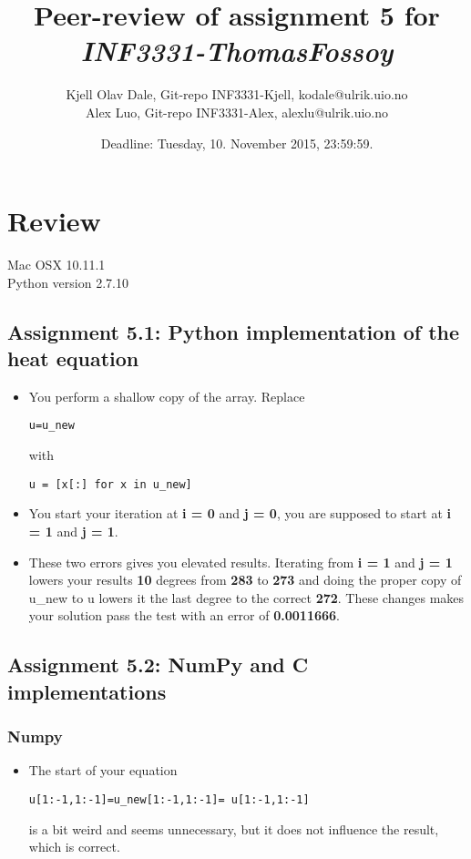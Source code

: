 \documentclass[a4paper]{article}
\title{Peer-review of assignment 5 for \textit{INF3331-ThomasFossoy}}
\author{Kjell Olav Dale, Git-repo INF3331-Kjell, {kodale@ulrik.uio.no} \\
 		Alex Luo, Git-repo INF3331-Alex, {alexlu@ulrik.uio.no}}
\date{Deadline: Tuesday, 10. November 2015, 23:59:59.}
\begin{document}
\maketitle

\section{Review}\label{sec:review}
Mac OSX 10.11.1\\Python version 2.7.10


\subsection*{Assignment 5.1:  Python implementation of the heat equation}
\begin{itemize}
\item You perform a shallow copy of the array. Replace\\\begin{verbatim}
u=u_new
\end{verbatim}
with\\\begin{verbatim}
u = [x[:] for x in u_new]
\end{verbatim}
\item You start your iteration at \textbf{i = 0} and \textbf{j = 0}, you are supposed to start at \textbf{i = 1} and \textbf{j = 1}.
\item These two errors gives you elevated results. Iterating from \textbf{i = 1} and \textbf{j = 1} lowers your results \textbf{10} degrees from \textbf{283} to \textbf{273} and doing the proper copy of u\_new to u lowers it the last degree to the correct \textbf{272}. These changes makes your solution pass the test with an error of \textbf{0.0011666}.

\end{itemize}

\subsection*{Assignment 5.2: NumPy and C implementations} \label{sec:assignment5.2}
\subsubsection*{Numpy} \label{sec:Numpy}
\begin{itemize}
\item The start of your equation\\\begin{verbatim}
u[1:-1,1:-1]=u_new[1:-1,1:-1]= u[1:-1,1:-1]
\end{verbatim} 
is a bit weird and seems unnecessary, but it does not influence the result, which is correct.
\end{itemize}
\end{document}
